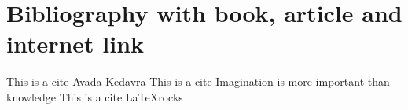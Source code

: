 \section{ Bibliography with book, article and internet link}
This is a cite \cite{harry} Avada Kedavra
This is a cite \cite{einstein} Imagination is more important than knowledge
This is a cite \cite{knuthwebsite} \LaTeX rocks
\printbibliography
